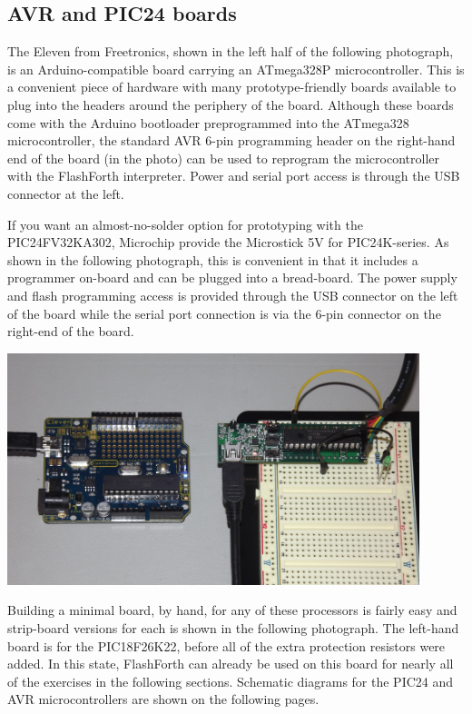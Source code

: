 \documentclass[12pt,a4paper]{article}
\begin{document}
\subsection{AVR and PIC24 boards}
%
The Eleven from Freetronics, shown in the left half of the following photograph,
is an Arduino-compatible board carrying an ATmega328P microcontroller.
This is a convenient piece of hardware with many prototype-friendly boards 
available to plug into the headers around the periphery of the board.
Although these boards come with the Arduino bootloader preprogrammed into the 
ATmega328 microcontroller, the standard AVR 6-pin programming header on the
right-hand end of the board (in the photo) can be used to reprogram the microcontroller
with the FlashForth interpreter.
Power and serial port access is through the USB connector at the left.

\medskip\noindent
If you want an almost-no-solder option for prototyping with the PIC24FV32KA302, 
Microchip provide the Microstick 5V for PIC24K-series.
As shown in the following photograph, this is convenient in that it includes 
a programmer on-board and can be plugged into a bread-board.
The power supply and flash programming access is provided through the USB connector 
on the left of the board while the serial port connection is via the 6-pin connector 
on the right-end of the board.

\medskip
\centerline{
\includegraphics[width=0.9\textwidth]{../figs/eleven-and-microstick-boards-2014.jpeg}
}

\newpage
\noindent
Building a minimal board, by hand, for any of these processors is fairly easy and 
strip-board versions for each is shown in the following photograph.
The left-hand board is for the PIC18F26K22, before all of the extra protection resistors
were added.  In this state, FlashForth can already be used on this board for nearly all 
of the exercises in the following sections.
Schematic diagrams for the PIC24 and AVR microcontrollers are shown on the following pages.
\end{document}
